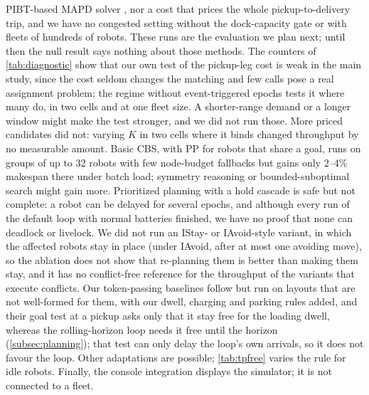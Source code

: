 PIBT-based MAPD solver \citep{okumura2022pibt}, nor a cost that prices the whole
pickup-to-delivery trip, and we have no congested setting without the
dock-capacity gate or with fleets of hundreds of robots. These runs are the
evaluation we plan next; until then the null result says nothing about those
methods. The counters of \cref{tab:diagnostic} show that our own test of
the pickup-leg cost is weak in the main study, since the cost seldom changes the matching and
few calls pose a real assignment problem; the regime without event-triggered epochs tests
it where many do, in two cells and at one fleet size. A shorter-range demand or a
longer window might make the test stronger, and we did not run those. More priced candidates
did not: varying $K$ in two cells where it binds changed throughput by no measurable amount. Basic CBS, with PP for robots that share a goal, runs on groups of up to 32
robots with few node-budget fallbacks but gains only 2--4\% makespan there under batch load; symmetry reasoning
\citep{li2019symmetry} or bounded-suboptimal search \citep{li2021eecbs}
might gain more. Prioritized planning with a hold cascade is safe but not
complete: a robot can be delayed for several epochs, and although every run of
the default loop with normal batteries finished, we have no proof that none can deadlock or
livelock. We did not run an IStay- or IAvoid-style variant, in which the
affected robots stay in place (under IAvoid, after at most one avoiding
move), so the ablation does not show that re-planning them is better than
making them stay, and it has no conflict-free reference for the throughput
of the variants that execute conflicts. Our token-passing baselines follow \citet{ma2017lifelong} but run
on layouts that are not well-formed for them, with our dwell, charging and
parking rules added, and their goal test at a pickup asks only that it stay free for
the loading dwell, whereas the rolling-horizon loop needs it free until the horizon
(\cref{subsec:planning}); that test can only delay the loop's own arrivals, so it does
not favour the loop. Other adaptations are possible; \cref{tab:tpfree} varies the rule for idle robots. Finally, the console
integration displays the simulator; it is not connected to a fleet.
